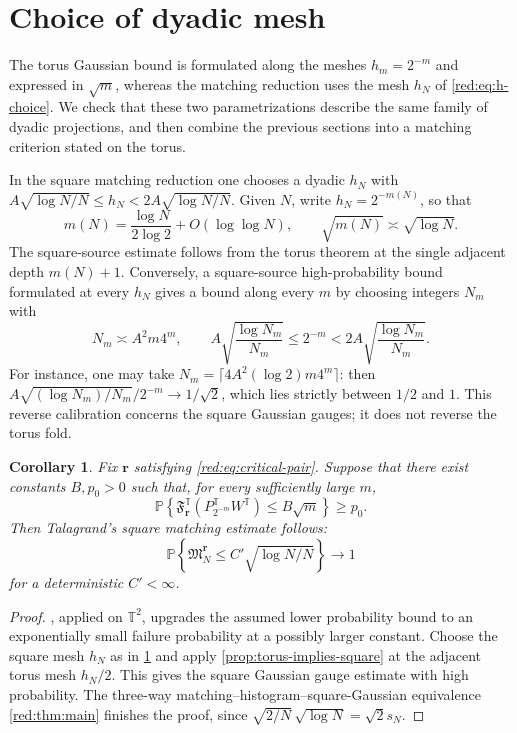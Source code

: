 \documentclass[11pt]{article}
\newtheorem{corollary}[corollary]{Corollary}
\theoremstyle{definition}
\theoremstyle{remark}
\numberwithin{equation}{section}
\newcommand{\T}{\mathbb T}
\begin{document}
\section{Choice of dyadic mesh}
\label{sec:alignment}
The torus Gaussian bound is formulated along the meshes $h_m=2^{-m}$ and
expressed in $\sqrt m$, whereas the matching reduction uses the mesh $h_N$
of \eqref{red:eq:h-choice}. We check that these two parametrizations
describe the same family of dyadic projections, and then combine the
previous sections into a matching criterion stated on the torus.

In the square matching reduction one chooses a dyadic $h_N$ with
$A\sqrt{\log N/N}\le h_N<2A\sqrt{\log N/N}$. Given
$N$, write $h_N=2^{-m(N)}$, so that
\[
 m(N)=\frac{\log N}{2\log2}+O(\log\log N),\qquad
 \sqrt{m(N)}\asymp\sqrt{\log N}.
\]
The square-source estimate follows from the torus theorem at the single
adjacent depth $m(N)+1$. Conversely, a square-source high-probability
bound formulated at every $h_N$ gives a bound along every $m$ by choosing
integers $N_m$ with
\[
 N_m\asymp A^2m4^m,
 \qquad
 A\sqrt{\frac{\log N_m}{N_m}}\le2^{-m}
 <2A\sqrt{\frac{\log N_m}{N_m}}.
\]
For instance, one may take
$N_m=\lceil4A^2(\log 2)m4^m\rceil$: then
$A\sqrt{(\log N_m)/N_m}/2^{-m}\to1/\sqrt2$,
which lies strictly between $1/2$ and $1$.
This reverse calibration concerns the square
Gaussian gauges; it does not reverse the torus fold.

\begin{corollary}
\label{cor:big-picture}
Fix $\boldsymbol r$ satisfying \eqref{red:eq:critical-pair}.
Suppose that there exist constants $B,p_0>0$ such that, for every
sufficiently large $m$,
\[
 \mathbb P\left\{\mathfrak F_{\boldsymbol r}^{\T}
 (P_{2^{-m}}^{\T}W^{\T})\le B\sqrt m\right\}
 \ge p_0.
\]
Then Talagrand's square matching estimate follows:
\[
 \mathbb P\left\{\mathfrak M_N^{\boldsymbol r}
 \le C'\sqrt{\log N/N}\right\}\longrightarrow1
\]
for a deterministic $C'<\infty$.
\end{corollary}


\begin{proof}
, applied on $\T^2$, upgrades
the assumed lower probability bound to an exponentially small failure
probability at a possibly larger constant. Choose the square mesh
$h_N$ as in \cref{sec:alignment} and apply
\cref{prop:torus-implies-square} at the adjacent torus mesh $h_N/2$.
This gives the square Gaussian gauge estimate with high probability.
The three-way matching--histogram--square-Gaussian equivalence
\cref{red:thm:main} finishes the proof, since
$\sqrt{2/N}\,\sqrt{\log N}=\sqrt2s_N$.
\end{proof}
\end{document}

